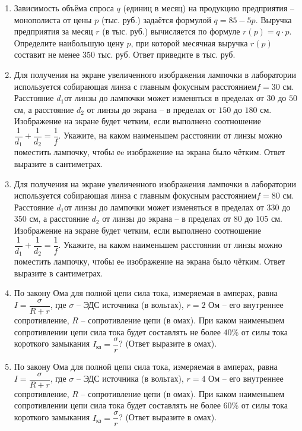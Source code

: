 \documentclass[12pt, a4paper]{article}
\begin{document}
\begin{enumerate}
		\item Зависимость объёма спроса \( q \) (единиц в месяц) на продукцию предприятия – монополиста от цены \( p \) (тыс. руб.) задаётся формулой \( q=85-5p \). Выручка предприятия за месяц \( r \) (в тыс. руб.) вычисляется по формуле \( r(p)=q\cdot p \). Определите наибольшую цену \( p \), при которой месячная выручка \( r(p) \) составит не менее \( 350 \) тыс. руб. Ответ приведите в тыс. руб.
		\item Для получения на экране увеличенного изображения лампочки в лаборатории используется собирающая линза с главным фокусным расстоянием\(  f = 30 \) см. Расстояние \( d_1  \)от линзы до лампочки может изменяться в пределах от \( 30 \) до \( 50 \) см, а расстояние \( d_2 \) от линзы до экрана – в пределах от \( 150 \) до \( 180 \) см. Изображение на экране будет четким, если выполнено соотношение \( \dfrac{1}{d_1}+\dfrac{1}{d_2}=\dfrac{1}{f} \). Укажите, на каком наименьшем расстоянии от линзы можно поместить лампочку, чтобы еe изображение на экрана было чётким. Ответ выразите в сантиметрах.
		\item Для получения на экране увеличенного изображения лампочки в лаборатории используется собирающая линза с главным фокусным расстоянием\(  f = 80 \) см. Расстояние \( d_1  \)от линзы до лампочки может изменяться в пределах от \( 33	0 \) до \( 350 \) см, а расстояние \( d_2 \) от линзы до экрана – в пределах от \( 80 \) до \( 105 \) см. Изображение на экране будет четким, если выполнено соотношение \( \dfrac{1}{d_1}+\dfrac{1}{d_2}=\dfrac{1}{f} \). Укажите, на каком наименьшем расстоянии от линзы можно поместить лампочку, чтобы еe изображение на экрана было чётким. Ответ выразите в сантиметрах.
		\item По закону Ома для полной цепи сила тока, измеряемая в амперах, равна \( I=\dfrac{\sigma}{R+r} \), где \(\sigma\) – ЭДС источника (в вольтах), \(r=2\) Ом – его внутреннее сопротивление, \(R\) – сопротивление цепи (в омах). При каком наименьшем сопротивлении цепи сила тока будет составлять не более \(40\% \) от силы тока короткого замыкания \( I_{кз} =\dfrac{\sigma}{r}\)? (Ответ выразите в омах).
		\item По закону Ома для полной цепи сила тока, измеряемая в амперах, равна \( I=\dfrac{\sigma}{R+r} \), где \(\sigma\) – ЭДС источника (в вольтах), \(r=4\) Ом – его внутреннее сопротивление, \(R\) – сопротивление цепи (в омах). При каком наименьшем сопротивлении цепи сила тока будет составлять не более \( 60\% \) от силы тока короткого замыкания \( I_{кз} =\dfrac{\sigma}{r}\)? (Ответ выразите в омах).

\end{enumerate}
\end{document}
